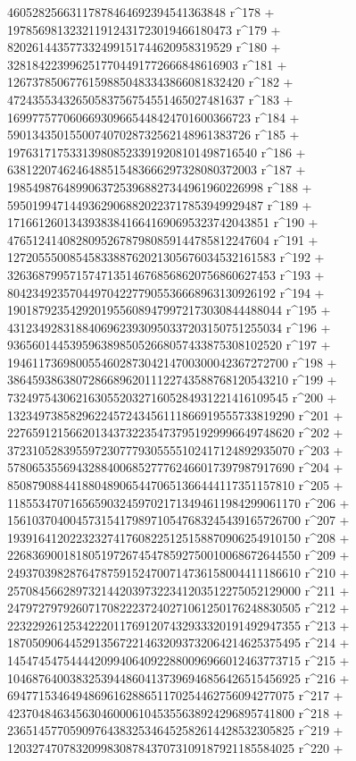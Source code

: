        46052825663117878464692394541363848 r^178 + 
       197856981323211912431723019466180473 r^179 + 
       820261443577332499151744620958319529 r^180 + 
       3281842239962517704491772666848616903 r^181 + 
       12673785067761598850483343866081832420 r^182 + 
       47243553432650583756754551465027481637 r^183 + 
       169977577060669309665448424701600366723 r^184 + 
       590134350155007407028732562148961383726 r^185 + 
       1976317175331398085233919208101498716540 r^186 + 
       6381220746246488515483666297328080372003 r^187 + 
       19854987648990637253968827344961960226998 r^188 + 
       59501994714493629068820223717853949929487 r^189 + 
       171661260134393838416641690695323742043851 r^190 + 
       476512414082809526787980859144785812247604 r^191 + 
       1272055500854583388762021305676034532161583 r^192 + 
       3263687995715747135146768568620756860627453 r^193 + 
       8042349235704497042277905536668963130926192 r^194 + 
       19018792354292019556089479972173030844488044 r^195 + 
       43123492831884069623930950337203150751255034 r^196 + 
       93656014453959638985052668057433875308102520 r^197 + 
       194611736980055460287304214700300042367272700 r^198 + 
       386459386380728668962011122743588768120543210 r^199 + 
       732497543062163055203271605284931221416109545 r^200 + 
       1323497385829622457243456111866919555733819290 r^201 + 
       2276591215662013437322354737951929996649748620 r^202 + 
       3723105283955972307779305555102417124892935070 r^203 + 
       5780653556943288400685277762466017397987917690 r^204 + 
       8508790884418804890654470651366444117351157810 r^205 + 
       11855347071656590324597021713494611984299061170 r^206 + 
       15610370400457315417989710547683245439165726700 r^207 + 
       19391641202232327417608225125158870906254910150 r^208 + 
       22683690018180519726745478592750010068672644550 r^209 + 
       24937039828764787591524700714736158004411186610 r^210 + 
       25708456628973214420397322341203512275052129000 r^211 + 
       24797279792607170822237240271061250176248830505 r^212 + 
       22322926125342220117691207432933320191492947355 r^213 + 
       18705090644529135672214632093732064214625375495 r^214 + 
       14547454754444209940640922880096966012463773715 r^215 + 
       10468764003832539448604137396946856426515456925 r^216 + 
       6947715346494869616288651170254462756094277075 r^217 + 
       4237048463456304600061045355638924296895741800 r^218 + 
       2365145770590976438325346452582614428532305825 r^219 + 
       1203274707832099830878437073109187921185584025 r^220 + 
